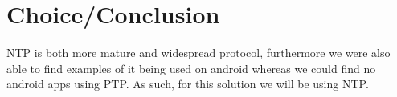 
\section{Choice/Conclusion}
\ac{NTP} is both more mature and widespread protocol, furthermore we were also able to find examples of it being used on android whereas we could find no android apps using \ac{PTP}.
As such, for this solution we will be using \ac{NTP}.
